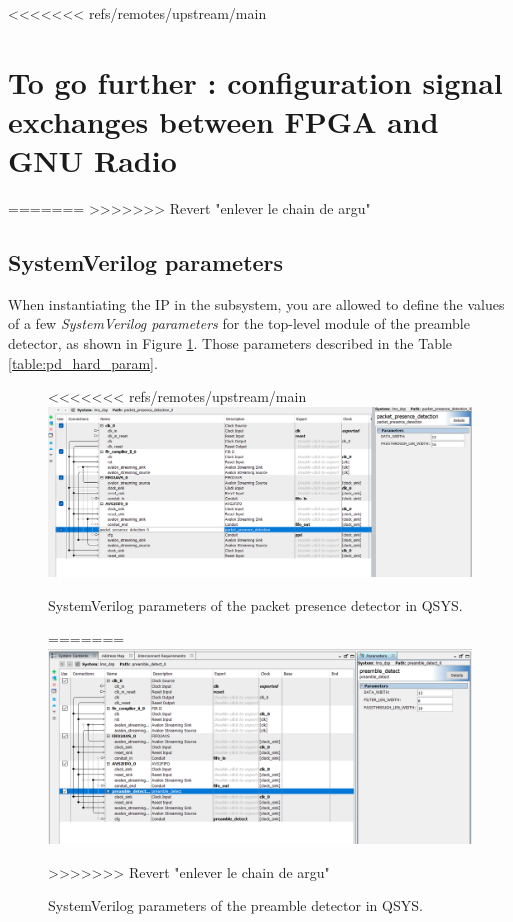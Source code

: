 <<<<<<< refs/remotes/upstream/main
\section{To go further : configuration signal exchanges between FPGA and GNU Radio}

=======
>>>>>>> Revert "enlever le chain de argu"
\subsection{SystemVerilog parameters}
When instantiating the IP in the subsystem, you are allowed to define the values of a few \textit{SystemVerilog parameters} for the top-level module of the preamble detector, as shown in Figure \ref{fig:pd_hard_param}. Those parameters described in the Table \ref{table:pd_hard_param}.

\begin{figure}[!h]
    \centering
<<<<<<< refs/remotes/upstream/main
    \includegraphics[width=\linewidth]{figures/ppd_detect_qsys_config.PNG}
    \caption{SystemVerilog parameters of the packet presence detector in QSYS.}
=======
    \includegraphics[width=\linewidth]{figures/preamble_detect_qsys_config.PNG}
    \caption{SystemVerilog parameters of the preamble detector in QSYS.}
>>>>>>> Revert "enlever le chain de argu"
    \label{fig:pd_hard_param}
\end{figure}

